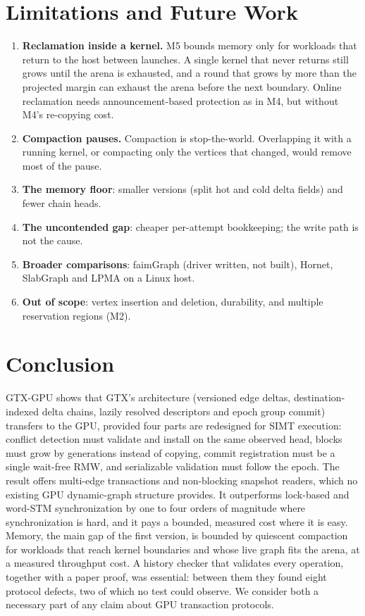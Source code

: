 \documentclass[sigconf,nonacm]{acmart}
\newcommand{\sys}{GTX-GPU}
\begin{document}
\section{Limitations and Future Work}
\label{sec:limits}
\begin{enumerate}
\item \textbf{Reclamation inside a kernel.} M5 bounds memory only for workloads that return to the host between
launches. A single kernel that never returns still grows until the arena is exhausted, and a round that grows by more
than the projected margin can exhaust the arena before the next boundary. Online reclamation needs announcement-based
protection as in M4, but without M4's re-copying cost.
\item \textbf{Compaction pauses.} Compaction is stop-the-world. Overlapping it with a running kernel, or compacting
only the vertices that changed, would remove most of the pause.
\item \textbf{The memory floor}: smaller versions (split hot and cold delta fields) and fewer chain heads.
\item \textbf{The uncontended gap}: cheaper per-attempt bookkeeping; the write path is not the cause.
\item \textbf{Broader comparisons}: faimGraph (driver written, not built), Hornet, SlabGraph and LPMA on a Linux host.
\item \textbf{Out of scope}: vertex insertion and deletion, durability, and multiple reservation regions (M2).
\end{enumerate}

\section{Conclusion}
\sys{} shows that GTX's architecture (versioned edge deltas, destination-indexed delta chains, lazily resolved
descriptors and epoch group commit) transfers to the GPU, provided four parts are redesigned for SIMT execution:
conflict detection must validate and install on the same observed head, blocks must grow by generations instead of
copying, commit registration must be a single wait-free RMW, and serializable validation must follow the epoch. The
result offers multi-edge transactions and non-blocking snapshot readers, which no existing GPU dynamic-graph structure
provides. It outperforms lock-based and word-STM synchronization by one to four orders of magnitude where
synchronization is hard, and it pays a bounded, measured cost where it is easy. Memory, the main gap of the first
version, is bounded by quiescent compaction for workloads that reach kernel boundaries and whose live graph fits
the arena, at a measured throughput cost.
A history checker that validates every operation, together with a paper proof, was essential: between them they found
eight protocol defects, two of which no test could observe. We consider both a necessary part of any claim about GPU
transaction protocols.
\end{document}

